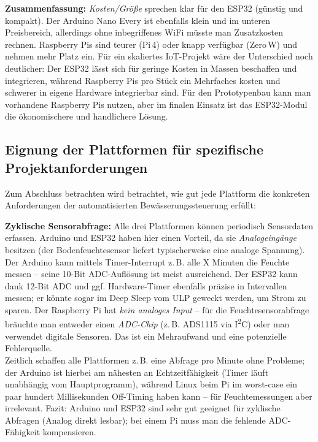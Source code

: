 \vspace{5mm}

\noindent\textbf{Zusammenfassung:} \textit{Kosten/Größe} sprechen klar für den ESP32 (günstig und kompakt). Der Arduino Nano Every ist ebenfalls klein und im unteren Preisbereich, allerdings ohne inbegriffenes WiFi müsste man Zusatzkosten rechnen. Raspberry Pis sind teurer (Pi\,4) oder knapp verfügbar (Zero\,W) und nehmen mehr Platz ein. Für ein skaliertes IoT-Projekt wäre der Unterschied noch deutlicher: Der ESP32 lässt sich für geringe Kosten in Massen beschaffen und integrieren, während Raspberry Pis pro Stück ein Mehrfaches kosten und schwerer in eigene Hardware integrierbar sind. Für den Prototypenbau kann man vorhandene Raspberry Pis nutzen, aber im finalen Einsatz ist das ESP32-Modul die ökonomischere und handlichere Lösung.

\subsection{Eignung der Plattformen für spezifische Projektanforderungen}

Zum Abschluss betrachten wird betrachtet, wie gut jede Plattform die konkreten Anforderungen der automatisierten Bewässerungssteuerung erfüllt:


\vspace{5mm}

\noindent\textbf{Zyklische Sensorabfrage:} Alle drei Plattformen können periodisch Sensordaten erfassen. Arduino und ESP32 haben hier einen Vorteil, da sie \textit{Analogeingänge} besitzen (der Bodenfeuchtesensor liefert typischerweise eine analoge Spannung). Der Arduino kann mittels Timer-Interrupt z.\,B. alle X Minuten die Feuchte messen – seine 10-Bit ADC-Auflösung ist meist ausreichend. \autocite{atmega_datasheet} Der ESP32 kann dank 12-Bit ADC und ggf. Hardware-Timer ebenfalls präzise in Intervallen messen; er könnte sogar im Deep Sleep vom ULP geweckt werden, um Strom zu sparen. \autocite{esp_datasheet} Der Raspberry Pi hat \textit{kein analoges Input} – für die Feuchtesensorabfrage bräuchte man entweder einen \textit{ADC-Chip} (z.\,B. ADS1115 via I\textsuperscript{2}C) oder man verwendet digitale Sensoren. Das ist ein Mehraufwand und eine potenzielle Fehlerquelle. \autocite{raspberry_pi_datasheet}
\\
Zeitlich schaffen alle Plattformen z.\,B. eine Abfrage pro Minute ohne Probleme; der Arduino ist hierbei am nähesten an Echtzeitfähigkeit (Timer läuft unabhängig vom Hauptprogramm), während Linux beim Pi im worst-case ein paar hundert Millisekunden Off-Timing haben kann – für Feuchtemessungen aber irrelevant. Fazit: Arduino und ESP32 sind sehr gut geeignet für zyklische Abfragen (Analog direkt lesbar); bei einem Pi muss man die fehlende ADC-Fähigkeit kompensieren.



